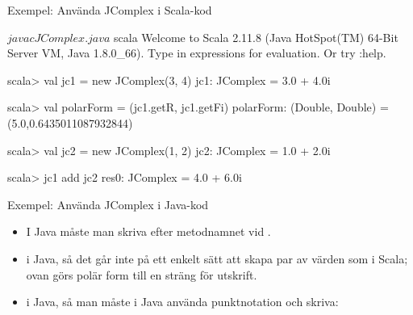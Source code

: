 \begin{Slide}{Exempel: Använda JComplex i Scala-kod}
\begin{REPL}
$ javac JComplex.java 
$ scala
Welcome to Scala 2.11.8 (Java HotSpot(TM) 64-Bit Server VM, Java 1.8.0_66).
Type in expressions for evaluation. Or try :help.

scala> val jc1 = new JComplex(3, 4)
jc1: JComplex = 3.0 + 4.0i

scala> val polarForm = (jc1.getR, jc1.getFi)
polarForm: (Double, Double) = (5.0,0.6435011087932844)

scala> val jc2 = new JComplex(1, 2)
jc2: JComplex = 1.0 + 2.0i

scala> jc1 add jc2
res0: JComplex = 4.0 + 6.0i
\end{REPL}
\end{Slide}




\begin{Slide}{Exempel: Använda JComplex i Java-kod}\SlideFontSmall
{}
\begin{itemize}
\item I Java måste man skriva  efter metodnamnet vid .

\item {} i Java, så det går inte på ett enkelt sätt att skapa par av värden som i Scala; ovan görs polär form till en sträng för utskrift.

\item {} i Java, så man måste i Java använda punktnotation och skriva: 
\end{itemize}
\end{Slide}










